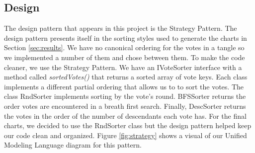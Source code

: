 \subsection{Design}

The design pattern that appears in this project is the Strategy Pattern.
The design pattern presents itself in the sorting styles used to generate the charts in Section \ref{sec:results}.
We have no canonical ordering for the votes in a tangle so we implemented a number of them and chose between them.
To make the code cleaner, we use the Strategy Pattern.
We have an IVoteSorter interface with a method called \textit{sortedVotes()} that returns a sorted array of vote keys.
Each class implements a different partial ordering that allows us to to sort the votes.
The class RndSorter implements sorting by the vote's round.
BFSSorter returns the order votes are encountered in a breath first search.
Finally, DescSorter returns the votes in the order of the number of descendants each vote has.
For the final charts, we decided to use the RndSorter class but the design pattern helped keep our code clean and organized.
Figure \ref{fig:strategy} shows a visual of our Unified Modeling Language diagram for this pattern.


